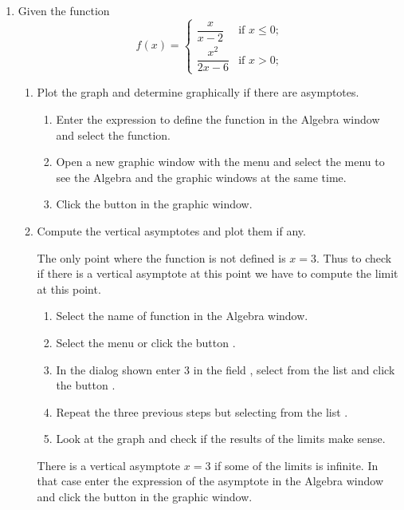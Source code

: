 \begin{enumerate}[leftmargin=*]
\item Given the function 
\[
f(x)=
\begin{cases}
\dfrac{x}{x-2} & \mbox{if $x\leq 0$;}\\
\dfrac{x^2}{2x-6} & \mbox{if $x>0$;}
\end{cases}
\]
\begin{enumerate}
\item Plot the graph and determine graphically if there are asymptotes. 
\begin{indication}
\begin{enumerate}
\item Enter the expression  to define the function in the Algebra window and select the function.
\item Open a new graphic window with the menu  and select the menu  to see the Algebra and the graphic windows at the same time.  
\item Click the button  in the graphic window.
\end{enumerate}
\end{indication}

\item Compute the vertical asymptotes and plot them if any. 
\begin{indication}
The only point where the function is not defined is $x=3$.
Thus to check if there is a vertical asymptote at this point we have to compute the limit at this point. 
\begin{enumerate}
\item Select the name of function in the Algebra window.
\item Select the menu  or click the button .
\item In the dialog shown enter 3 in the field , select  from the list  and click the button . 
\item Repeat the three previous steps but selecting  from the list .
\item Look at the graph and check if the results of the limits make sense. 
\end{enumerate}
There is a vertical asymptote $x=3$ if some of the limits is infinite.
In that case enter the expression of the asymptote in the Algebra window and click the button  in the graphic window.
\end{indication}


\end{enumerate}
\end{enumerate}
